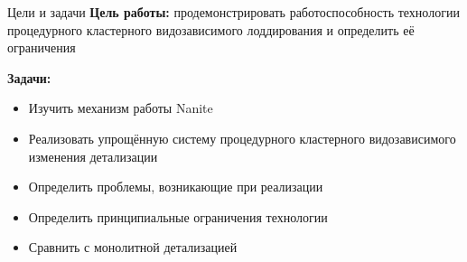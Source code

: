 \begin{frame}{Цели и задачи}
    \textbf{Цель работы:}
    продемонстрировать работоспособность технологии процедурного кластерного видозависимого лоддирования и определить её ограничения

    \bigskip

    \textbf{Задачи:}
    \begin{itemize}
        \item Изучить механизм работы Nanite
        \item Реализовать упрощённую систему процедурного кластерного видозависимого изменения детализации
        \item Определить проблемы, возникающие при реализации
        \item Определить принципиальные ограничения технологии
        \item Сравнить с монолитной детализацией
    \end{itemize}
\end{frame}
